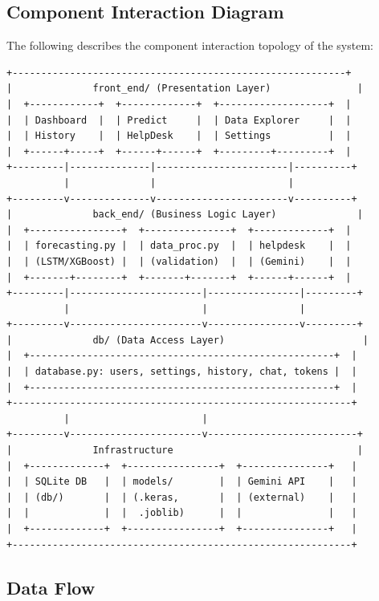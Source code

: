 \subsection{Component Interaction Diagram}

The following describes the component interaction topology of the system:

\begin{verbatim}
+----------------------------------------------------------+
|              front_end/ (Presentation Layer)               |
|  +------------+  +-------------+  +-------------------+  |
|  | Dashboard  |  | Predict     |  | Data Explorer     |  |
|  | History    |  | HelpDesk    |  | Settings          |  |
|  +------+-----+  +------+------+  +---------+---------+  |
+---------|--------------|-----------------------|----------+
          |              |                       |
+---------v--------------v-----------------------v----------+
|              back_end/ (Business Logic Layer)              |
|  +----------------+  +---------------+  +-------------+  |
|  | forecasting.py |  | data_proc.py  |  | helpdesk    |  |
|  | (LSTM/XGBoost) |  | (validation)  |  | (Gemini)    |  |
|  +-------+--------+  +-------+-------+  +------+------+  |
+---------|-----------------------|----------------|---------+
          |                       |                |
+---------v-----------------------v----------------v---------+
|              db/ (Data Access Layer)                        |
|  +-----------------------------------------------------+  |
|  | database.py: users, settings, history, chat, tokens |  |
|  +-----------------------------------------------------+  |
+-----------------------------------------------------------+
          |                       |
+---------v-----------------------v--------------------------+
|              Infrastructure                                |
|  +-------------+  +----------------+  +---------------+   |
|  | SQLite DB   |  | models/        |  | Gemini API    |   |
|  | (db/)       |  | (.keras,       |  | (external)    |   |
|  |             |  |  .joblib)      |  |               |   |
|  +-------------+  +----------------+  +---------------+   |
+-----------------------------------------------------------+
\end{verbatim}

\subsection{Data Flow}

